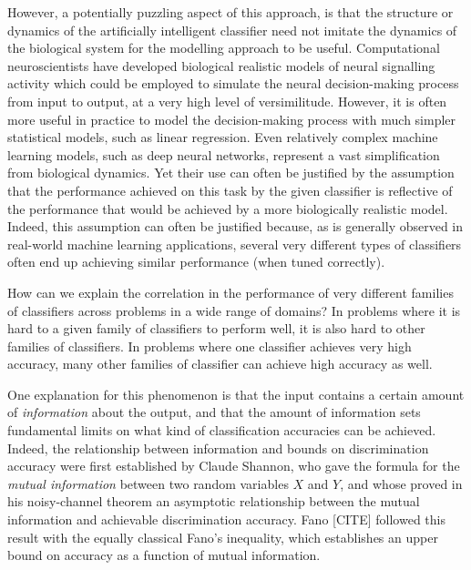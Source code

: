 However, a potentially puzzling aspect of this approach, is that the
structure or dynamics of the artificially intelligent classifier need
not imitate the dynamics of the biological system for the modelling
approach to be useful.  Computational neuroscientists have developed
biological realistic models of neural signalling activity which could
be employed to simulate the neural decision-making process from input
to output, at a very high level of versimilitude.  However, it is
often more useful in practice to model the decision-making process
with much simpler statistical models, such as linear regression.  Even
relatively complex machine learning models, such as deep neural
networks, represent a vast simplification from biological dynamics.
Yet their use can often be justified by the assumption that the
performance achieved on this task by the given classifier is
reflective of the performance that would be achieved by a more
biologically realistic model.  Indeed, this assumption can often be
justified because, as is generally observed in real-world machine
learning applications, several very different types of classifiers
often end up achieving similar performance (when tuned correctly).

How can we explain the correlation in the performance of very
different families of classifiers across problems in a wide range of
domains? In problems where it is hard to a given family of classifiers
to perform well, it is also hard to other families of classifiers.  In
problems where one classifier achieves very high accuracy, many other
families of classifier can achieve high accuracy as well.  

One explanation for this phenomenon is that the input contains a
certain amount of \emph{information} about the output, and that the
amount of information sets fundamental limits on what kind of
classification accuracies can be achieved.  Indeed, the relationship
between information and bounds on discrimination accuracy were first
established by Claude Shannon, who gave the formula for the
\emph{mutual information} between two random variables $X$ and $Y$,
and whose proved in his noisy-channel theorem an asymptotic
relationship between the mutual information and achievable
discrimination accuracy.  Fano [CITE] followed this result with the
equally classical Fano's inequality, which establishes an upper bound
on accuracy as a function of mutual information.

